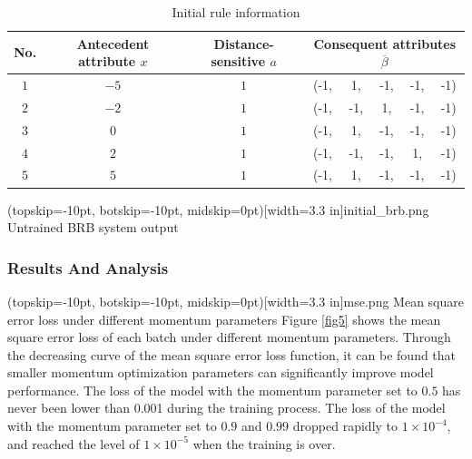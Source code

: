 \documentclass{ieeeaccess}
\begin{document}
\begin{table}
    \caption{Initial rule information}
    \centering
    \normalsize
    \label{tab1}
    \begin{tabular}{cccccccc}
        \hline
        No. & Antecedent attribute $x$ & Distance-sensitive $a$ & \multicolumn{5}{c}{Consequent attributes $\overline{\beta}$}                         \\
        \hline
        $1$ & $-5$                     & $1$                    & (-1,                                                         & 1,  & -1, & -1, & -1) \\
        $2$ & $-2$                     & $1$                    & (-1,                                                         & -1, & 1,  & -1, & -1) \\
        $3$ & $0$                      & $1$                    & (-1,                                                         & 1,  & -1, & -1, & -1) \\
        $4$ & $2$                      & $1$                    & (-1,                                                         & -1, & -1, & 1,  & -1) \\
        $5$ & $5$                      & $1$                    & (-1,                                                         & 1,  & -1, & -1, & -1) \\
        \hline
    \end{tabular}
\end{table}

\Figure[!t](topskip=-10pt, botskip=-10pt, midskip=0pt)[width=3.3 in]{initial_brb.png}
{Untrained BRB system output\label{fig4}}

\subsubsection{Results And Analysis}
\Figure[!t](topskip=-10pt, botskip=-10pt, midskip=0pt)[width=3.3 in]{mse.png}
{Mean square error loss under different momentum parameters\label{fig5}}
Figure \ref{fig5} shows the mean square error loss of each batch under different momentum parameters.
Through the decreasing curve of the mean square error loss function,
it can be found that smaller momentum optimization parameters can significantly improve model performance.
The loss of the model with the momentum parameter set to $0.5$ has never been lower than 0.001 during the training process.
The loss of the model with the momentum parameter set to $0.9$ and $0.99$ dropped rapidly to $1\times10^{-4}$,
and reached the level of $1\times10^{-5}$ when the training is over.
\end{document}
